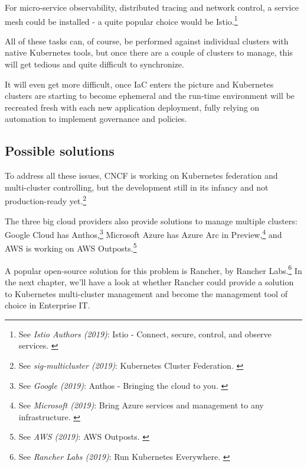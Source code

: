 For micro-service observability, distributed tracing and network control, a service mesh could be installed - a quite popular choice would be Istio.\footnote{See \textit{Istio Authors (2019)}: Istio - Connect, secure, control, and observe services. \cite{istio}}

All of these tasks can, of course, be performed against individual clusters with native Kubernetes tools, but once there are a couple of clusters to manage, this will get tedious and quite difficult to synchronize.

It will even get more difficult, once IaC enters the picture and Kubernetes clusters are starting to become ephemeral and the run-time environment will be recreated fresh with each new application deployment, fully relying on automation to implement governance and policies.

\subsection{Possible solutions}

To address all these issues, CNCF is working on Kubernetes federation and multi-cluster controlling, but the development still in its infancy and not production-ready yet.\footnote{See \textit{sig-multicluster (2019)}: Kubernetes Cluster Federation. \cite{kubeFed}}

The three big cloud providers also provide solutions to manage multiple clusters: Google Cloud has Anthos,\footnote{See \textit{Google (2019)}: Anthos - Bringing the cloud to you. \cite{googleAnthos}} Microsoft Azure has Azure Arc in Preview,\footnote{See \textit{Microsoft (2019)}: Bring Azure services and management to any infrastructure. \cite{azureArc}} and AWS is working on AWS Outposts.\footnote{See \textit{AWS (2019)}: AWS Outposts. \cite{awsOutposts}}

A popular open-source solution for this problem is Rancher, by Rancher Labs.\footnote{See \textit{Rancher Labs (2019)}: Run Kubernetes Everywhere. \cite{rancher}} In the next chapter, we'll have a look at whether Rancher could provide a solution to Kubernetes multi-cluster management and become the management tool of choice in Enterprise IT.
